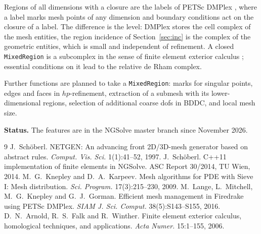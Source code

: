 \documentclass[10pt,a4paper]{article}
\newcommand{\code}[1]{\texttt{#1}}
\begin{document}
Regions of all dimensions with a closure are the labels of PETSc DMPlex \cite{ks09,lmkg16}, where a label marks mesh points of any dimension and boundary conditions act on the closure of a label. The difference is the level: DMPlex stores the cell complex of the mesh entities, the region incidence of Section~\ref{sec:inc} is the complex of the geometric entities, which is small and independent of refinement. A closed \code{MixedRegion} is a subcomplex in the sense of finite element exterior calculus \cite{afw06}; essential conditions on it lead to the relative de Rham complex.

Further functions are planned to take a \code{MixedRegion}: marks for singular points, edges and faces in $hp$-refinement, extraction of a submesh with its lower-dimensional regions, selection of additional coarse dofs in BDDC, and local mesh size.

\textbf{Status.} The features are in the NGSolve master branch since November 2026.

{\small
\begin{thebibliography}{9}\setlength{\itemsep}{1pt}
 J.~Sch\"oberl. NETGEN: An advancing front 2D/3D-mesh generator based on abstract rules. \emph{Comput. Vis. Sci.} 1(1):41--52, 1997.
 J.~Sch\"oberl. C++11 implementation of finite elements in NGSolve. ASC Report 30/2014, TU Wien, 2014.
 M.~G.~Knepley and D.~A.~Karpeev. Mesh algorithms for PDE with Sieve I: Mesh distribution. \emph{Sci. Program.} 17(3):215--230, 2009.
 M.~Lange, L.~Mitchell, M.~G.~Knepley and G.~J.~Gorman. Efficient mesh management in Firedrake using PETSc DMPlex. \emph{SIAM J. Sci. Comput.} 38(5):S143--S155, 2016.
 D.~N.~Arnold, R.~S.~Falk and R.~Winther. Finite element exterior calculus, homological techniques, and applications. \emph{Acta Numer.} 15:1--155, 2006.
\end{thebibliography}}
\end{document}

